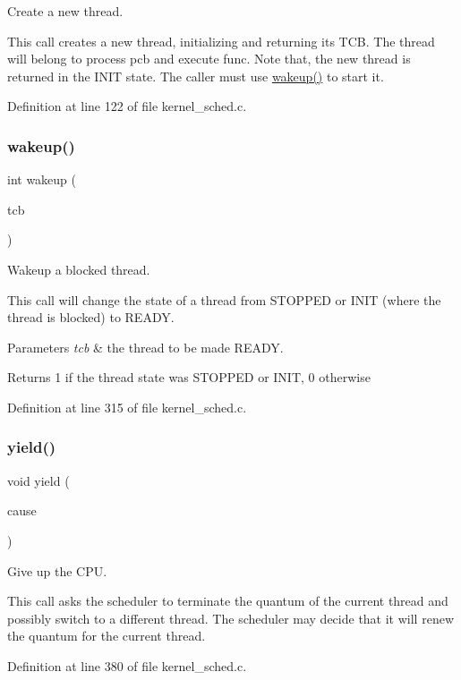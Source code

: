 Create a new thread. 

This call creates a new thread, initializing and returning its T\+CB. The thread will belong to process {\ttfamily pcb} and execute {\ttfamily func}. Note that, the new thread is returned in the {\ttfamily I\+N\+IT} state. The caller must use {\ttfamily \hyperlink{group__scheduler_gae8301452fd9ae5bf7cd7f2676650ff06}{wakeup()}} to start it. 

Definition at line 122 of file kernel\+\_\+sched.\+c.

\mbox{\label{group__scheduler_gae8301452fd9ae5bf7cd7f2676650ff06}} 
\subsubsection{\texorpdfstring{wakeup()}{wakeup()}}
{\footnotesize\ttfamily int wakeup (\begin{DoxyParamCaption}\item[{\hyperlink{group__scheduler_gaf88d9c946bf70b36a1e8bc34383abfc9}{T\+CB} $\ast$}]{tcb }\end{DoxyParamCaption})}



Wakeup a blocked thread. 

This call will change the state of a thread from {\ttfamily S\+T\+O\+P\+P\+ED} or {\ttfamily I\+N\+IT} (where the thread is blocked) to {\ttfamily R\+E\+A\+DY}.


\begin{DoxyParams}{Parameters}
{\em tcb} & the thread to be made {\ttfamily R\+E\+A\+DY}. \\
\hline
\end{DoxyParams}
\begin{DoxyReturn}{Returns}
1 if the thread state was {\ttfamily S\+T\+O\+P\+P\+ED} or {\ttfamily I\+N\+IT}, 0 otherwise 
\end{DoxyReturn}


Definition at line 315 of file kernel\+\_\+sched.\+c.

\mbox{\label{group__scheduler_ga1db327892199949812ae5a52119f2e97}} 
\subsubsection{\texorpdfstring{yield()}{yield()}}
{\footnotesize\ttfamily void yield (\begin{DoxyParamCaption}\item[{enum \hyperlink{group__scheduler_gaad787d8d80312ffca3c0f197b3a25fbe}{S\+C\+H\+E\+D\+\_\+\+C\+A\+U\+SE}}]{cause }\end{DoxyParamCaption})}



Give up the C\+PU. 

This call asks the scheduler to terminate the quantum of the current thread and possibly switch to a different thread. The scheduler may decide that it will renew the quantum for the current thread. 

Definition at line 380 of file kernel\+\_\+sched.\+c.

